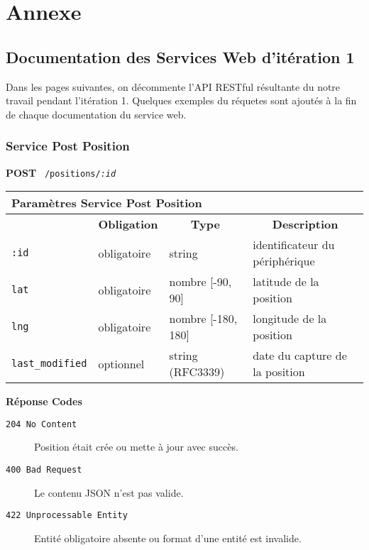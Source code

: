 \chapter{Annexe}
\pagebreak

\section{Documentation des Services Web d'itération 1}

Dans les pages suivantes, on décommente l'API RESTful résultante du notre
travail pendant l'itération 1. Quelques exemples du réquetes sont ajoutés à la
fin de chaque documentation du service web.

\clearpage
\subsection{Service Post Position}
\label{appendix:sprint1-position-post-doc}

\textbf{POST} \ \texttt{/positions/\textit{:id}}

\begin{table}[htbp]
    \centering
    \begin{tabularx}{\textwidth}{llll}
        \multicolumn{4}{X}{\textbf{Paramètres Service Post Position}} \\
        \toprule
        \rowcolor{gray!20}
        \multicolumn{1}{c}{\textbf{Élément}} &
        \multicolumn{1}{c}{\textbf{Obligation}} &
        \multicolumn{1}{c}{\textbf{Type}} &
        \multicolumn{1}{c}{\textbf{Description}} \\
        \midrule
        \verb|:id| & obligatoire & string & identificateur du périphérique \\
        \verb|lat| & obligatoire & nombre [-90, 90] & latitude de la position \\
        \verb|lng| & obligatoire & nombre [-180, 180] & longitude de la position \\
        \verb|last_modified| & optionnel & string (RFC3339) & date du capture de la position \\
        \bottomrule
    \end{tabularx}
\end{table}

\textbf{Réponse Codes}

\begin{description}
    \item[\texttt{204 No Content}] Position était crée ou mette à jour avec succès.
    \item[\texttt{400 Bad Request}] Le contenu JSON n'est pas valide.
    \item[\texttt{422 Unprocessable Entity}] Entité obligatoire absente ou format d'une entité est invalide.
\end{description}

